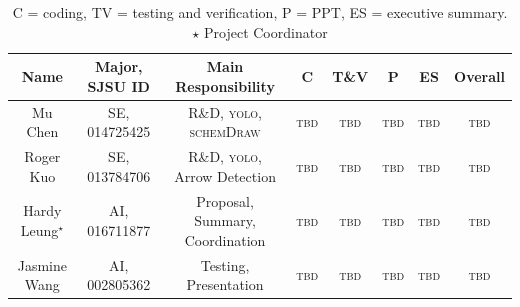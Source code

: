 \documentclass[10pt]{article}
\begin{document}


\begin{table}[htbp]
\centering
\begin{tabular}{|c|c|c|c|c|c|c|c|}
\hline
Name & Major, SJSU ID & Main Responsibility & \textsc{C} &
	\textsc{T\&V} & \textsc{P} & \textsc{ES} & Overall \\
\hline
Mu Chen & SE, 014725425 & R\&D, \textsc{yolo}, \textsc{schemDraw} & \textsc{tbd} & \textsc{tbd} & \textsc{tbd} & \textsc{tbd} & \textsc{tbd} \\
Roger Kuo & SE, 013784706 & R\&D, \textsc{yolo}, Arrow Detection & \textsc{tbd} & \textsc{tbd} & \textsc{tbd} & \textsc{tbd} & \textsc{tbd} \\
Hardy Leung${}^\star$ & AI, 016711877 &
Proposal, Summary, Coordination & \textsc{tbd} & \textsc{tbd} & \textsc{tbd} & \textsc{tbd} & \textsc{tbd} \\
Jasmine Wang & AI, 002805362 & Testing, Presentation & \textsc{tbd} & \textsc{tbd} & \textsc{tbd} & \textsc{tbd} & \textsc{tbd} \\ \hline
\end{tabular}
\caption{\textsc{C} = coding, \textsc{TV} =
testing and verification,
\textsc{P} = PPT, \textsc{ES} = executive summary. $\star$ Project Coordinator}
\end{table}

% 
% 
\end{document}
